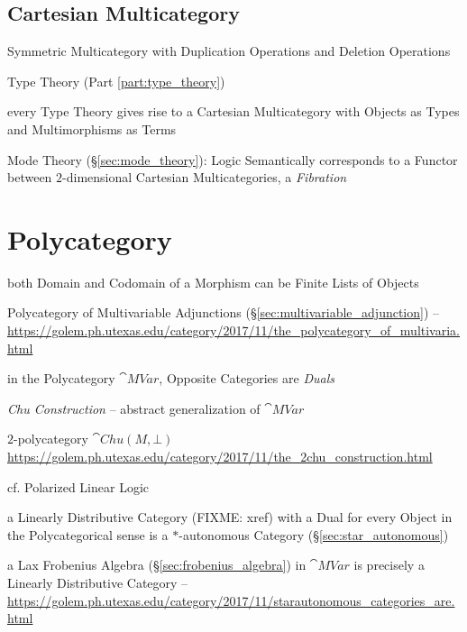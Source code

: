 \subsection{Cartesian Multicategory}\label{sec:cartesian_multicategory}

Symmetric Multicategory with Duplication Operations and Deletion
Operations

Type Theory (Part \ref{part:type_theory})

every Type Theory gives rise to a Cartesian Multicategory with Objects
as Types and Multimorphisms as Terms

Mode Theory (\S\ref{sec:mode_theory}): Logic Semantically corresponds
to a Functor between $2$-dimensional Cartesian Multicategories, a
\emph{Fibration}



\section{Polycategory}\label{sec:polycategory}

both Domain and Codomain of a Morphism can be Finite Lists of Objects

Polycategory of Multivariable Adjunctions
(\S\ref{sec:multivariable_adjunction}) --
\url{https://golem.ph.utexas.edu/category/2017/11/the_polycategory_of_multivaria.html}

in the Polycategory $\cat{MVar}$, Opposite Categories are \emph{Duals}


\emph{Chu Construction} -- abstract generalization of $\cat{MVar}$

$2$-polycategory $\cat{Chu}(M,\bot)$
\url{https://golem.ph.utexas.edu/category/2017/11/the_2chu_construction.html}

cf. Polarized Linear Logic

a Linearly Distributive Category (FIXME: xref) with a Dual for every Object in
the Polycategorical sense is a $*$-autonomous Category
(\S\ref{sec:star_autonomous})

a Lax Frobenius Algebra (\S\ref{sec:frobenius_algebra}) in $\cat{MVar}$ is
precisely a Linearly Distributive Category
--\url{https://golem.ph.utexas.edu/category/2017/11/starautonomous_categories_are.html}



